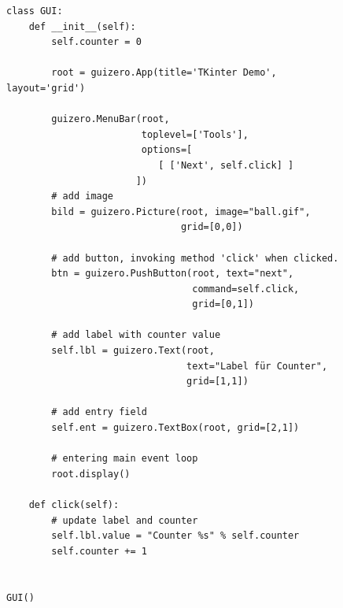 \documentclass{tufte-handout}
\begin{document}
\begin{figure}
	\begin{lstlisting}
class GUI:
    def __init__(self):
        self.counter = 0

        root = guizero.App(title='TKinter Demo', layout='grid')

        guizero.MenuBar(root,
                        toplevel=['Tools'],
                        options=[
                           [ ['Next', self.click] ]
                       ])
        # add image
        bild = guizero.Picture(root, image="ball.gif",
                               grid=[0,0])

        # add button, invoking method 'click' when clicked.
        btn = guizero.PushButton(root, text="next", 
                                 command=self.click,
                                 grid=[0,1])

        # add label with counter value
        self.lbl = guizero.Text(root, 
                                text="Label für Counter",
                                grid=[1,1])

        # add entry field
        self.ent = guizero.TextBox(root, grid=[2,1])

        # entering main event loop
        root.display()

    def click(self):
        # update label and counter
        self.lbl.value = "Counter %s" % self.counter
        self.counter += 1


GUI()	
\end{lstlisting}
\end{figure} 
 
\end{document}
